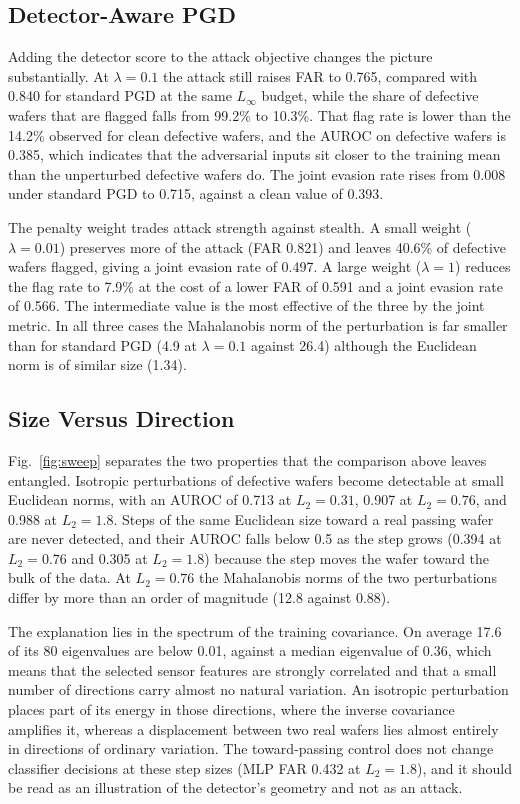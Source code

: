 \documentclass[preprint,12pt,authoryear]{elsarticle}
\begin{document}
\subsection{Detector-Aware PGD}
Adding the detector score to the attack objective changes the picture substantially. At $\lambda=0.1$ the attack still raises FAR to 0.765, compared with 0.840 for standard PGD at the same $L_\infty$ budget, while the share of defective wafers that are flagged falls from 99.2\% to 10.3\%. That flag rate is lower than the 14.2\% observed for clean defective wafers, and the AUROC on defective wafers is 0.385, which indicates that the adversarial inputs sit closer to the training mean than the unperturbed defective wafers do. The joint evasion rate rises from 0.008 under standard PGD to 0.715, against a clean value of 0.393.

The penalty weight trades attack strength against stealth. A small weight ($\lambda=0.01$) preserves more of the attack (FAR 0.821) and leaves 40.6\% of defective wafers flagged, giving a joint evasion rate of 0.497. A large weight ($\lambda=1$) reduces the flag rate to 7.9\% at the cost of a lower FAR of 0.591 and a joint evasion rate of 0.566. The intermediate value is the most effective of the three by the joint metric. In all three cases the Mahalanobis norm of the perturbation is far smaller than for standard PGD (4.9 at $\lambda=0.1$ against 26.4) although the Euclidean norm is of similar size (1.34).

\subsection{Size Versus Direction}
\label{sec:geometry}
Fig.~\ref{fig:sweep} separates the two properties that the comparison above leaves entangled. Isotropic perturbations of defective wafers become detectable at small Euclidean norms, with an AUROC of 0.713 at $L_2=0.31$, 0.907 at $L_2=0.76$, and 0.988 at $L_2=1.8$. Steps of the same Euclidean size toward a real passing wafer are never detected, and their AUROC falls below 0.5 as the step grows (0.394 at $L_2=0.76$ and 0.305 at $L_2=1.8$) because the step moves the wafer toward the bulk of the data. At $L_2=0.76$ the Mahalanobis norms of the two perturbations differ by more than an order of magnitude (12.8 against 0.88).

The explanation lies in the spectrum of the training covariance. On average 17.6 of its 80 eigenvalues are below 0.01, against a median eigenvalue of 0.36, which means that the selected sensor features are strongly correlated and that a small number of directions carry almost no natural variation. An isotropic perturbation places part of its energy in those directions, where the inverse covariance amplifies it, whereas a displacement between two real wafers lies almost entirely in directions of ordinary variation. The toward-passing control does not change classifier decisions at these step sizes (MLP FAR 0.432 at $L_2=1.8$), and it should be read as an illustration of the detector's geometry and not as an attack.
\end{document}

